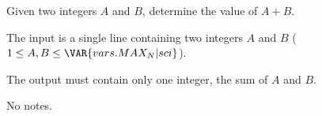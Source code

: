 Given two integers $A$ and $B$, determine the value of $A + B$.

The input is a single line containing two integers $A$ and $B$ ($1 \leq A, B \leq \VAR{vars.MAX_N | sci}$).

The output must contain only one integer, the sum of $A$ and $B$.

No notes.
